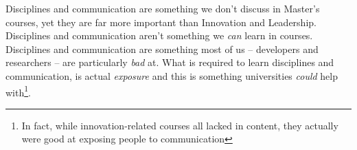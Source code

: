 Disciplines and communication are something we don't discuss in Master's
courses, yet they are far more important than Innovation and Leadership.
Disciplines and communication aren't something we \emph{can} learn in courses.
Disciplines and communication are something most of us -- developers and
researchers -- are particularly \emph{bad} at.  What is required to learn
disciplines and communication, is actual \emph{exposure} and this is something
universities \emph{could} help with\footnote{In fact, while innovation-related
courses all lacked in content, they actually were good at exposing people to
communication}.
